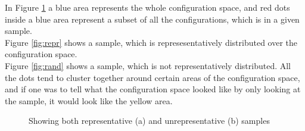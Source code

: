 \documentclass[a4paper,11pt]{report}
\newcommand{\figa}{
    \begin{figure}[!htpb]
    \centering
}
\newcommand{\figb}[2]{
    \caption{#1}
    \label{#2}
    \end{figure}
}
\begin{document}
In Figure \ref{fig:reprrand} a blue area represents the whole configuration 
space, and red dots inside a blue area represent a subset of all the 
configurations, which is in a given sample.
\\

Figure \ref{fig:repr} shows a sample, which is represesentatively distributed 
over the configuration space. 
\\

Figure \ref{fig:rand} shows a sample, which is not representatively 
distributed. All the dots tend to cluster together around certain areas of the 
configuration space, and if one was to tell what the configuration space looked 
like by only looking at the sample, it would look like the yellow area.

\figa
\figb{Showing both representative (a) and unrepresentative (b) samples}{fig:reprrand}
\end{document}
